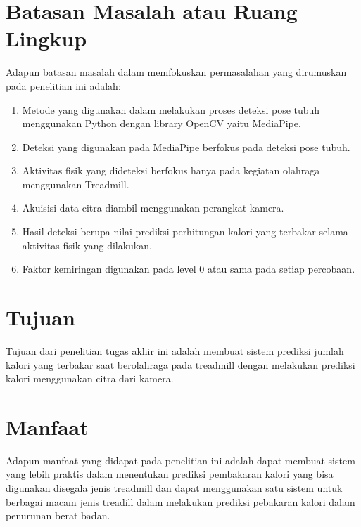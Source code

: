 \section{Batasan Masalah atau Ruang Lingkup}

Adapun batasan masalah dalam memfokuskan permasalahan yang dirumuskan pada penelitian ini adalah:

\begin{enumerate}[nolistsep]

    \item Metode yang digunakan dalam melakukan proses deteksi pose tubuh menggunakan Python dengan library OpenCV yaitu MediaPipe.
  
    \item Deteksi yang digunakan pada MediaPipe berfokus pada deteksi pose tubuh.
  
    \item Aktivitas fisik yang dideteksi berfokus hanya pada kegiatan olahraga menggunakan Treadmill.
    
    \item Akuisisi data citra diambil menggunakan perangkat kamera.
    
    \item Hasil deteksi berupa nilai prediksi perhitungan kalori yang terbakar selama aktivitas fisik yang dilakukan.

    \item Faktor kemiringan digunakan pada level 0 atau sama pada setiap percobaan.
  
\end{enumerate}

\section{Tujuan}

Tujuan dari penelitian tugas akhir ini adalah membuat sistem prediksi jumlah kalori yang terbakar saat berolahraga pada treadmill dengan melakukan prediksi kalori menggunakan citra dari kamera.

\section{Manfaat}

Adapun manfaat yang didapat pada penelitian ini adalah dapat membuat sistem yang lebih praktis dalam menentukan prediksi pembakaran kalori yang bisa digunakan disegala jenis treadmill dan dapat menggunakan satu sistem untuk berbagai macam jenis treadill dalam melakukan prediksi pebakaran kalori dalam penurunan berat badan.

